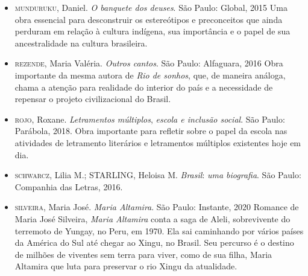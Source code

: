 \documentclass[12pt]{extarticle}
\begin{document}
\begin{itemize}
\item \textsc{munduruku}, Daniel. \emph{O banquete dos deuses}. São Paulo: Global,
    2015
    Uma obra essencial para desconstruir os estereótipos e preconceitos
    que ainda perduram em relação à cultura indígena, sua importância e
    o papel de sua ancestralidade na cultura brasileira.
\item \textsc{rezende}, Maria Valéria. \emph{Outros cantos}. São Paulo: Alfaguara,
    2016
    Obra importante da mesma autora de \emph{Rio de sonhos}, que, de
    maneira análoga, chama a atenção para realidade do interior do país
    e a necessidade de repensar o projeto civilizacional do Brasil.
 \item \textsc{rojo}, Roxane. \emph{Letramentos múltiplos}, \emph{escola e inclusão
    social}. São Paulo: Parábola, 2018.
    Obra importante para refletir sobre o papel da escola nas atividades
    de letramento literários e letramentos múltiplos existentes hoje em
    dia.
 \item \textsc{schwarcz,} Lilia M.; \textsc{STARLING}, Heloisa M.
    \emph{Brasil}: \emph{uma biografia}. São Paulo: Companhia das
    Letras, 2016.
\item \textsc{silveira}, Maria José. \emph{Maria Altamira}. São Paulo: Instante,
    2020
    Romance de Maria José Silveira, \emph{Maria Altamira} conta a saga
    de Aleli, sobrevivente do terremoto de Yungay, no Peru, em 1970. Ela
    sai caminhando por vários países da América do Sul até chegar ao
    Xingu, no Brasil. Seu percurso é o destino de milhões de viventes
    sem terra para viver, como de sua filha, Maria Altamira que luta
    para preservar o rio Xingu da atualidade.
\end{itemize}
\end{document}
